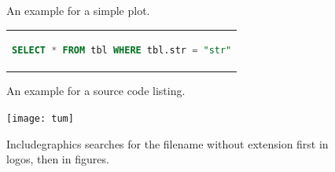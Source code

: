 \begin{figure}[htpb]
    \centering

    \exampleA
    \exampleB
    \caption[Example plot]{An example for a simple plot.}\label{fig:sample-plot}
\end{figure}

\begin{figure}[htpb]
    \centering
    \begin{tabular}{c}
        \begin{lstlisting}[language=SQL]
    SELECT * FROM tbl WHERE tbl.str = "str"
  \end{lstlisting}
    \end{tabular}
    \caption[Example listing]{An example for a source code listing.}\label{fig:sample-listing}
\end{figure}

\begin{figure}[htpb]
    \centering
    \texttt{[image: tum]}
    \caption[Something else can be written here for listing this, otherwise the caption will be written!]{Includegraphics searches for the filename without extension first in logos, then in figures.} \label{fig:tum}
\end{figure}

